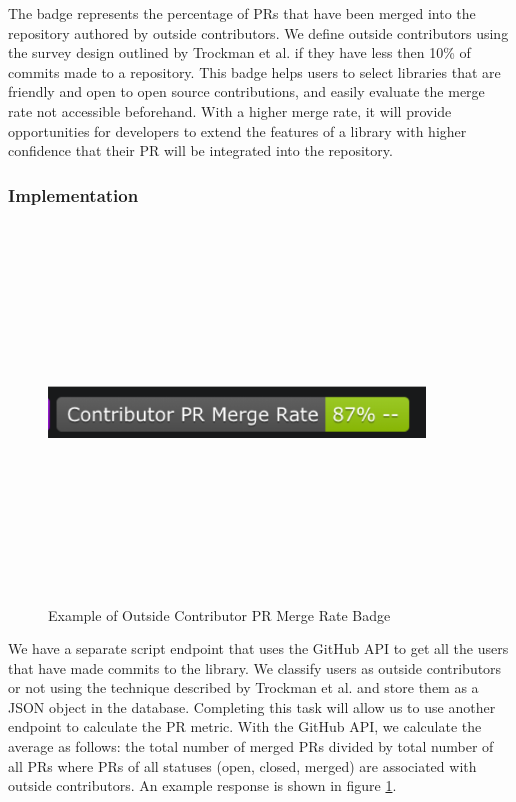 \documentclass[12pt, letterpaper]{article}
\begin{document}
The badge represents the percentage of PRs that have been merged into the repository authored by outside contributors.
We define outside contributors using the survey design outlined by Trockman et al. \cite{githubbadges} if they have 
less then 10\% of commits made to a repository. 
This badge helps users to select libraries that are friendly and open to open source contributions,
and easily evaluate the merge rate not accessible beforehand.
With a higher merge rate, it will provide opportunities for developers to extend the features of a library with 
higher confidence that their PR will be integrated into the repository.

\subsubsection{Implementation}

\begin{figure}[!htb]
    \centerline{
        \includegraphics[width=10cm,height=10cm,keepaspectratio=true]{prbadge}
    }
    \caption{
        Example of Outside Contributor PR Merge Rate Badge 
    }
    \label{prbadge}
\end{figure}

We have a separate script endpoint that uses the GitHub \cite{github} API to get all the users
that have made commits to the library. We classify users as outside contributors or not using
the technique described by Trockman et al. \cite{githubbadges} and store them as a JSON object in the database.
Completing this task will allow us to use another endpoint to calculate the PR metric.
With the GitHub \cite{github} API, we calculate
the average as follows: the total number of merged PRs divided by total number of all PRs where 
PRs of all statuses (open, closed, merged) are associated with outside contributors. 
An example response is shown in figure \ref{prbadge}.
\end{document}
